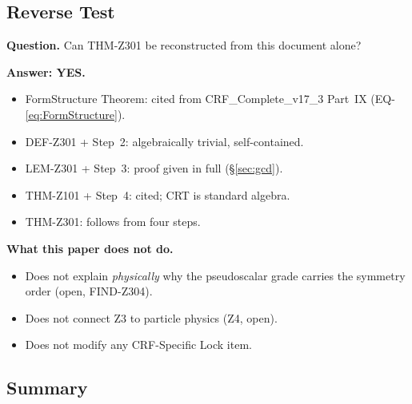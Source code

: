 \documentclass[12pt, a4paper]{article}
\begin{document}
\subsection{Reverse Test}
\label{sec:reverse}

\begin{formalbox}[title={Reconstruction Test (CUIP No-Loss)}]
\textbf{Question.} Can THM-Z301 be reconstructed from this
document alone?

\textbf{Answer: YES.}
\begin{itemize}[leftmargin=*]
  \item FormStructure Theorem: cited from CRF\_Complete\_v17\_3
    Part~IX (EQ-\ref{eq:FormStructure}).
  \item DEF-Z301 + Step~2: algebraically trivial, self-contained.
  \item LEM-Z301 + Step~3: proof given in full (\S\ref{sec:gcd}).
  \item THM-Z101 + Step~4: cited; CRT is standard algebra.
  \item THM-Z301: follows from four steps.
\end{itemize}

\textbf{What this paper does not do.}
\begin{itemize}[leftmargin=*]
  \item Does not explain \emph{physically} why the pseudoscalar
    grade carries the symmetry order (open, FIND-Z304).
  \item Does not connect Z3 to particle physics (Z4, open).
  \item Does not modify any CRF-Specific Lock item.
\end{itemize}
\end{formalbox}

\subsection{Summary}
\label{sec:summary}
\end{document}
